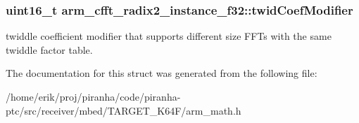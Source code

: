 \subsubsection[{\texorpdfstring{twid\+Coef\+Modifier}{twidCoefModifier}}]{\setlength{\rightskip}{0pt plus 5cm}uint16\+\_\+t arm\+\_\+cfft\+\_\+radix2\+\_\+instance\+\_\+f32\+::twid\+Coef\+Modifier}\hypertarget{structarm__cfft__radix2__instance__f32_a411f75b6ed01690293f4f5988030ea42}{}\label{structarm__cfft__radix2__instance__f32_a411f75b6ed01690293f4f5988030ea42}
twiddle coefficient modifier that supports different size F\+F\+Ts with the same twiddle factor table. 

The documentation for this struct was generated from the following file\+:\begin{DoxyCompactItemize}
\item 
/home/erik/proj/piranha/code/piranha-\/ptc/src/receiver/mbed/\+T\+A\+R\+G\+E\+T\+\_\+\+K64\+F/arm\+\_\+math.\+h\end{DoxyCompactItemize}
